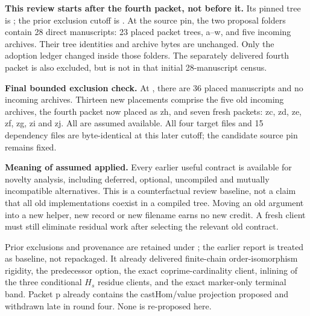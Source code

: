 \textbf{This review starts after the fourth packet, not before it.} Its pinned tree is
; the prior exclusion cutoff is
.
At the source pin, the two proposal folders contain 28 direct manuscripts: 23 placed packet trees, a--w, and five incoming archives. Their tree identities and archive bytes are unchanged. Only the adoption ledger changed inside those folders. The separately delivered fourth packet is also excluded, but is not in that initial 28-manuscript census.

\textbf{Final bounded exclusion check.} At , there are 36 placed manuscripts and no incoming archives. Thirteen new placements comprise the five old incoming archives, the fourth packet now placed as zh, and seven fresh packets: zc, zd, ze, zf, zg, zi and zj. All are assumed available. All four target files and 15 dependency files are byte-identical at this later cutoff; the candidate source pin remains fixed.

\textbf{Meaning of assumed applied.} Every earlier useful contract is available for novelty analysis, including deferred, optional, uncompiled and mutually incompatible alternatives. This is a counterfactual review baseline, not a claim that all old implementations coexist in a compiled tree. Moving an old argument into a new helper, new record or new filename earns no new credit. A fresh client must still eliminate residual work after selecting the relevant old contract.

Prior exclusions and provenance are retained under ; the earlier report is treated as baseline, not repackaged. It already delivered finite-chain order-isomorphism rigidity, the  predecessor option, the exact coprime-cardinality client, inlining of the three conditional $H_s$ residue clients, and the exact marker-only terminal band. Packet p already contains the castHom/value projection proposed and withdrawn late in round four. None is re-proposed here.

